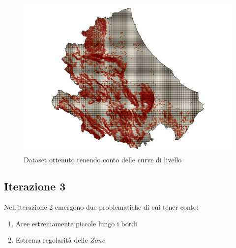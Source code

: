 \begin{figure}[h]
	\centering
	\includegraphics[width=1\textwidth]{images/abruzzoZKquadretto.png}
	\caption{Dataset ottenuto tenendo conto delle curve di livello}
	\label{fig:dataset_it_2}
\end{figure}


\subsection{\textbf{Iterazione 3}}

Nell'iterazione 2 emergono due problematiche di cui tener conto:

\begin{enumerate}
	\item Aree estremamente piccole lungo i bordi
	\item Estrema regolarità delle \textit{Zone}
\end{enumerate}

